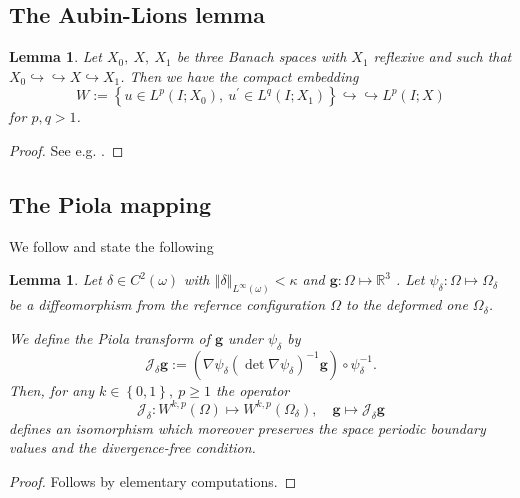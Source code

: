 \documentclass[10pt,a4paper]{article}
\newtheorem{lemma}[theorem]{Lemma}
\numberwithin{equation}{section}
\begin{document}
\subsection{The Aubin-Lions lemma}
\begin{lemma}
Let $X_0,\  X,\  X_1$ be three Banach spaces with $X_1$ reflexive and  such that $X_{0}\hookrightarrow\hookrightarrow X\hookrightarrow X_{1}$. Then we have the compact embedding
\[
W:=\left\{ u\in L^{p}\left(I;X_{0}\right),\ u^{\prime}\in L^{q}\left(I;X_{1}\right)\right\} \hookrightarrow\hookrightarrow L^{p}\left(I;X\right)
\]
for $p,q>1$.\end{lemma}
\begin{proof}
    See e.g. \cite{Seregin}.
\end{proof}
\subsection{The Piola mapping}
We follow \cite[Remark 2.5]{LR14} and state the following
\begin{lemma}\label{lm:Piola}
 Let $\delta \in C^{2}(\omega)$  with $\left\Vert \delta\right\Vert _{L^{\infty}\left(\omega\right)}<\kappa$ and $\mathbf{g}: \Omega \mapsto\mathbb{R}^{3}$ . 
 Let $\psi_{\delta}:\Omega\mapsto\Omega_{\delta}$ be a diffeomorphism from the refernce configuration $\Omega$ to the deformed one $\Omega_{\delta}$.
 
 We define the    \emph{Piola transform} of $\mathbf{g}$ under $\psi_\delta$ by 
 \[
\mathcal{J}_{\delta}\mathbf{g}:=\left(\nabla\psi_{\delta}\left(\det\nabla\psi_{\delta}\right)^{-1}\mathbf{g}\right)\circ\psi_{\delta}^{-1}.
 \]
Then, for any $k\in\left\{ 0,1\right\} ,\ p\ge1$ the operator 
\[
\mathcal{J}_{\delta}:W^{k,p}\left(\Omega\right)\mapsto W^{k,p}\left(\Omega_{\delta}\right),\quad\mathbf{g}\mapsto\mathcal{J}_{\delta}\mathbf{g}
\]
defines an isomorphism which  moreover preserves the space periodic boundary values and the divergence-free condition. 

\end{lemma}
\begin{proof}
Follows by elementary computations.
\end{proof}
\end{document}
